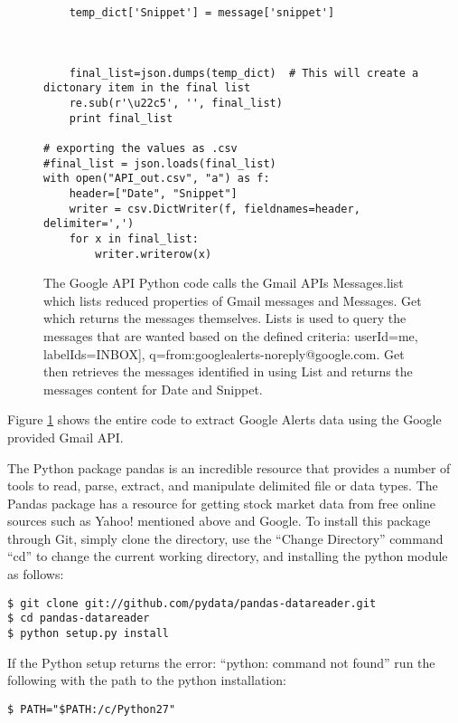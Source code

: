 \documentclass[sigconf]{acmart}
\begin{document}
\begin{figure}[htb]
\begin{verbatim}
    temp_dict['Snippet'] = message['snippet']



    final_list=json.dumps(temp_dict)  # This will create a dictonary item in the final list
    re.sub(r'\u22c5', '', final_list)
    print final_list

# exporting the values as .csv
#final_list = json.loads(final_list)
with open("API_out.csv", "a") as f:
    header=["Date", "Snippet"]
    writer = csv.DictWriter(f, fieldnames=header, delimiter=',')
    for x in final_list:
        writer.writerow(x)
\end{verbatim}
\caption{The Google API Python code calls the Gmail APIs Messages.list which lists reduced properties of Gmail messages and Messages. Get which returns the messages themselves. Lists is used to query the messages that are wanted based on the defined criteria: userId=me, labelIds=INBOX], q=from:googlealerts-noreply@google.com. Get then retrieves the messages identified in using List and returns the messages content for Date and Snippet.}\label{c:googleapi}
\end{figure}

Figure \ref{c:googleapi} shows the entire code to extract Google Alerts data using the Google provided Gmail API.


The Python package pandas is an incredible resource that provides a number of tools to read, parse, extract, and manipulate delimited file or data types. The Pandas package has a resource for getting stock market data from free online sources such as Yahoo! mentioned above and Google. To install this package through Git, simply clone the directory, use the ``Change Directory'' command ``cd'' to change the current working directory, and installing the python module as follows: 

\begin{mdframed}[style=default]
\begin{lstlisting}
$ git clone git://github.com/pydata/pandas-datareader.git
$ cd pandas-datareader
$ python setup.py install
\end{lstlisting}
\end{mdframed}

If the Python setup returns the error: ``python: command not found'' run the following with the path to the python installation:
\begin{mdframed}[style=default]
\begin{lstlisting}
$ PATH="$PATH:/c/Python27"
\end{lstlisting}
\end{mdframed}
\end{document}

